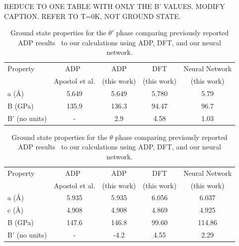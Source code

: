 \documentclass{article}
\begin{document}
REDUCE TO ONE TABLE WITH ONLY THE B' VALUES.  MODIFY CAPTION.  REFER TO T=0K, NOT GROUND STATE.
\begin{table}[H]
    \caption{Ground state properties for the $\theta'$ phase comparing previously reported ADP results~\cite{Apostol2011} to our calculations using ADP, DFT, and our neural network.}
\begin{tabular}{lcccc}
\hline
\hline
Property        & ADP~\cite{Apostol2011}             & ADP          & DFT        & Neural Network \\ 
                & Apostol et al.        & (this work)  & (this work)& (this work)    \\ 
\hline 
a  (\AA)        & 5.649                 & 5.649        & 5.780      & 5.79           \\
B  (GPa)        & 135.9                 & 136.3        & 94.47      & 96.7           \\
B' (no units)   & -                     & 2.9          & 4.58       & 1.03           \\ 
\hline
\hline
\end{tabular}
\label{albert_tab1}
\end{table}


\begin{table}[H]
    \caption{Ground state properties for the $\theta$ phase comparing previously reported ADP results~\cite{Apostol2011} to our calculations using ADP, DFT, and our neural network.}
\begin{tabular}{lcccc}
\hline
\hline
Property        & ADP~\cite{Apostol2011}             & ADP          & DFT        & Neural Network \\ 
               & Apostol et al.        & (this work)  & (this work)& (this work)    \\ 
\hline 
a  (\AA)        & 5.935                 & 5.935        & 6.056      & 6.037          \\
c  (\AA)        & 4.908                 & 4.908        & 4.869      & 4.925          \\
B  (GPa)        & 147.6                 & 146.8        & 99.60      & 114.86         \\
B' (no units)   & -                     & -4.2         & 4.55       & 2.29           \\ 
\hline
\hline
\end{tabular}
\label{albert_tab2}
\end{table}
\end{document}
